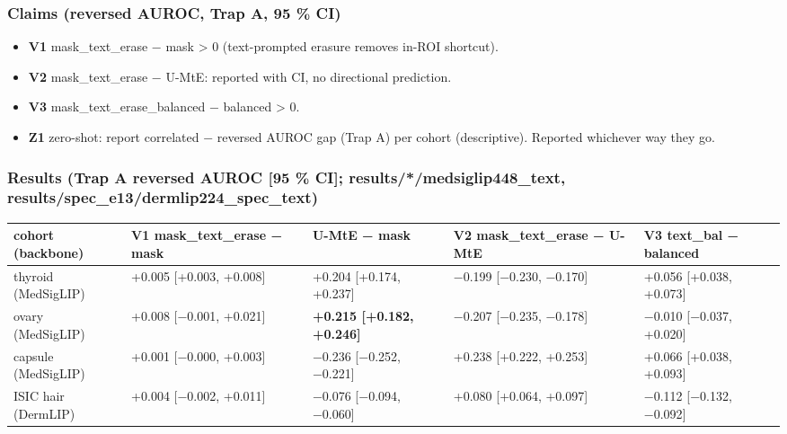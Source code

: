 {\subsubsection{Claims (reversed AUROC, Trap A, 95 \% CI)}\label{claims-reversed-auroc-trap-a-95--ci}

\begin{itemize}

\item
  \textbf{V1} mask\_text\_erase − mask \textgreater{} 0 (text-prompted erasure removes in-ROI shortcut).
\item
  \textbf{V2} mask\_text\_erase − U-MtE: reported with CI, no directional prediction.
\item
  \textbf{V3} mask\_text\_erase\_balanced − balanced \textgreater{} 0.
\item
  \textbf{Z1} zero-shot: report correlated − reversed AUROC gap (Trap A) per cohort (descriptive).
  Reported whichever way they go.
\end{itemize}

\subsubsection{Results (Trap A reversed AUROC {[}95 \% CI{]}; results/*/medsiglip448\_text, results/spec\_e13/dermlip224\_spec\_text)}\label{results-trap-a-reversed-auroc-95--ci-resultsmedsiglip448_text-resultsspec_e13dermlip224_spec_text}

{ %
\begin{longtable}[]{@{}lllll@{}}
\toprule\noalign{}
cohort (backbone) & V1 mask\_text\_erase − mask & U-MtE − mask & V2 mask\_text\_erase − U-MtE & V3 text\_bal − balanced \\
\midrule\noalign{}
\endhead
\bottomrule\noalign{}
\endlastfoot
thyroid (MedSigLIP) & +0.005 {[}+0.003, +0.008{]} & +0.204 {[}+0.174, +0.237{]} & −0.199 {[}−0.230, −0.170{]} & +0.056 {[}+0.038, +0.073{]} \\
ovary (MedSigLIP) & +0.008 {[}−0.001, +0.021{]} & \textbf{+0.215 {[}+0.182, +0.246{]}} & −0.207 {[}−0.235, −0.178{]} & −0.010 {[}−0.037, +0.020{]} \\
capsule (MedSigLIP) & +0.001 {[}−0.000, +0.003{]} & −0.236 {[}−0.252, −0.221{]} & +0.238 {[}+0.222, +0.253{]} & +0.066 {[}+0.038, +0.093{]} \\
ISIC hair (DermLIP) & +0.004 {[}−0.002, +0.011{]} & −0.076 {[}−0.094, −0.060{]} & +0.080 {[}+0.064, +0.097{]} & −0.112 {[}−0.132, −0.092{]} \\
\end{longtable}
}

}

